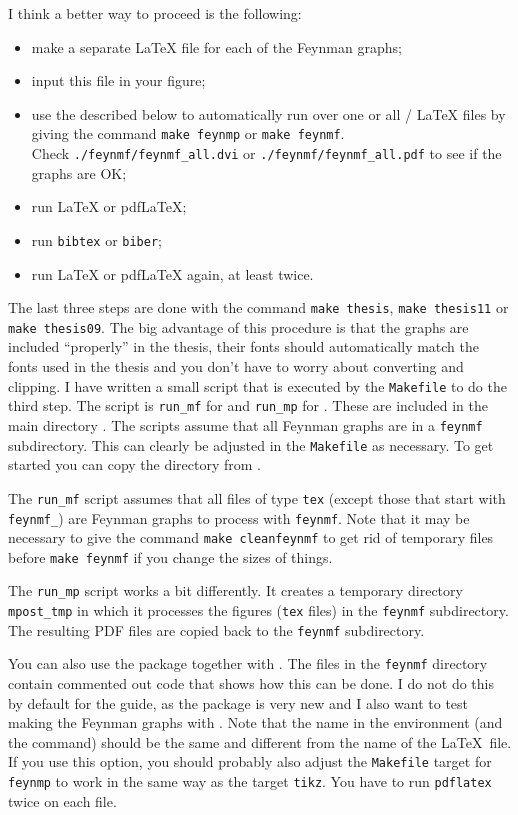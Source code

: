 I think a better way to proceed is the following:
\begin{itemize}
\item make a separate \LaTeX{} file for each of the Feynman graphs;
\item input this file in your figure;
\item use the  described below to automatically run
  over one or all / \LaTeX{} files by giving the
  command \texttt{make feynmp} or \texttt{make feynmf}.\\
  Check
  \texttt{./feynmf/feynmf\_all.dvi} or
  \texttt{./feynmf/feynmf\_all.pdf} to see if the graphs are OK\@;
\item run \LaTeX{} or pdf\LaTeX; %
\item run \texttt{bibtex} or \texttt{biber};
\item run \LaTeX{} or pdf\LaTeX{} again, at least twice.
\end{itemize}
The last three steps are done with the command \texttt{make thesis},
\texttt{make thesis11} or
\texttt{make thesis09}.
The big advantage of this procedure is that the graphs are included
\enquote{properly} in the thesis, their fonts should automatically
match the fonts used in the thesis and you don't have to worry about
converting and clipping. I have written a small script that is
executed by the \texttt{Makefile} to do the third step.
The script is \texttt{run\_mf} for  and
\texttt{run\_mp} for . These are
included in the main directory .
The scripts assume that all Feynman graphs are in 
a \texttt{feynmf} subdirectory. This can clearly be
adjusted in the \texttt{Makefile} as necessary.
To get started you can copy the  directory from .

The \texttt{run\_mf} script assumes that all files of type
\texttt{tex} (except those that start with \texttt{feynmf\_}) are
Feynman graphs to process with \texttt{feynmf}. Note that it may be
necessary to give the command \texttt{make cleanfeynmf} to get rid of
temporary files before \texttt{make feynmf} if you change the sizes of
things.

The \texttt{run\_mp} script works a bit differently. It creates a
temporary directory \texttt{mpost\_tmp} in which it processes the
figures (\texttt{tex} files) in the \texttt{feynmf} subdirectory. The
resulting PDF files are copied back to the \texttt{feynmf}
subdirectory.

You can also use the package  together with
. The files in the \texttt{feynmf} directory contain
commented out code that shows how this can be done. I do not do this
by default for the guide, as the package is very new and I also want
to test making the Feynman graphs with . Note that
the name in the  environment (and the 
command) should be the same and different from the name of the \LaTeX\
file. If you use this option, you should probably also adjust the
\texttt{Makefile} target for \texttt{feynmp} to work in the same way
as the target \texttt{tikz}. You have to run \texttt{pdflatex} twice
on each file.


